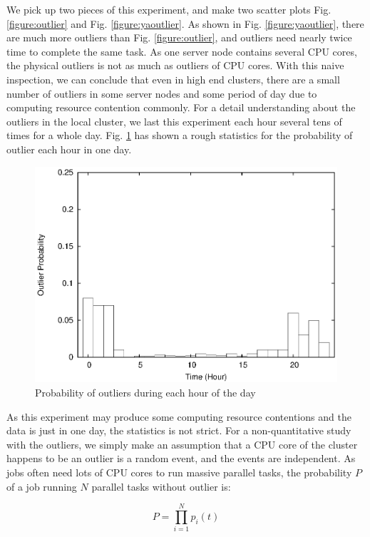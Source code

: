We pick up two pieces of this experiment, and make two scatter plots Fig.
\ref{figure:outlier} and Fig. \ref{figure:yaoutlier}. As shown in Fig.
\ref{figure:yaoutlier}, there are much more outliers than Fig. \ref{figure:outlier}, and
outliers need nearly twice time to complete the same task. As one server node contains
several CPU cores, the physical outliers is not as much as outliers of CPU cores. With
this naive inspection, we can conclude that even in high end clusters, there are a small
number of outliers in some server nodes and some period of day due to computing resource
contention commonly. For a detail understanding about the outliers in the local cluster,
we last this experiment each hour several tens of times for a whole day. Fig.
\ref{figure:outlier_stats} has shown a rough statistics for the probability of outlier
each hour in one day.

\begin{figure}
\centering
\includegraphics[width=0.9\columnwidth]{figures/outlier_stats.eps}
\caption{Probability of outliers during each hour of the day}
\label{figure:outlier_stats}
\end{figure}

As this experiment may produce some computing resource contentions and the data is just in
one day, the statistics is not strict. For a non-quantitative study with the outliers, we
simply make an assumption that a CPU core of the cluster happens to be an outlier is a
random event, and the events are independent. As jobs often need lots of CPU cores to run
massive parallel tasks, the probability $P$ of a job running $N$ parallel tasks without
outlier is:

$$P = \prod_{i=1}^N p_i(t)$$

